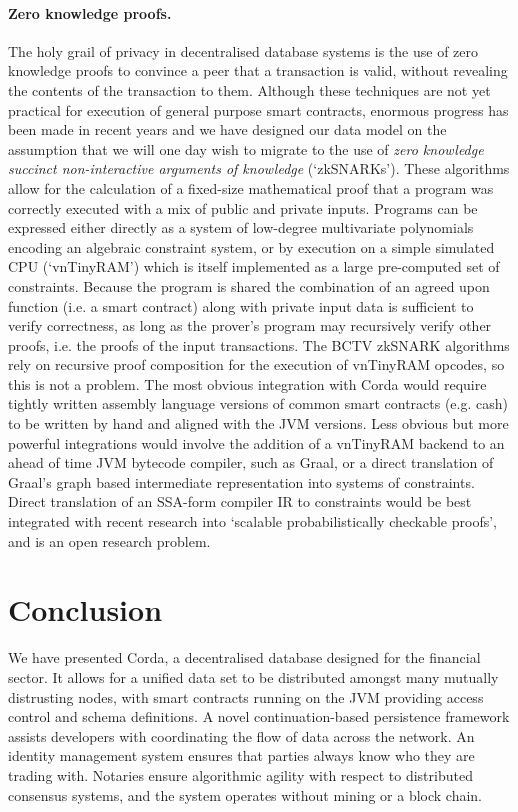 \documentclass{article}
\begin{document}
\paragraph{Zero knowledge proofs.}The holy grail of privacy in decentralised database systems is the use of zero
knowledge proofs to convince a peer that a transaction is valid, without revealing the contents of the transaction to
them. Although these techniques are not yet practical for execution of general purpose smart contracts, enormous
progress has been made in recent years and we have designed our data model on the assumption that we will one day wish
to migrate to the use of \emph{zero knowledge succinct non-interactive arguments of knowledge}\cite{184425}
(`zkSNARKs'). These algorithms allow for the calculation of a fixed-size mathematical proof that a program was correctly
executed with a mix of public and private inputs. Programs can be expressed either directly as a system of low-degree
multivariate polynomials encoding an algebraic constraint system, or by execution on a simple simulated CPU (`vnTinyRAM') which is itself
implemented as a large pre-computed set of constraints. Because the program is shared the combination of an
agreed upon function (i.e. a smart contract) along with private input data is sufficient to verify correctness,
as long as the prover's program may recursively verify other proofs, i.e. the proofs of the input transactions.
The BCTV zkSNARK algorithms rely on recursive proof composition for the execution of vnTinyRAM opcodes, so this is not a
problem. The most obvious integration with Corda would require tightly written assembly language versions of common
smart contracts (e.g. cash) to be written by hand and aligned with the JVM versions. Less obvious but more powerful
integrations would involve the addition of a vnTinyRAM backend to an ahead of time JVM bytecode compiler, such as
Graal\cite{Graal}, or a direct translation of Graal's graph based intermediate representation into systems of constraints.
Direct translation of an SSA-form compiler IR to constraints would be best integrated with recent research
into `scalable probabilistically checkable proofs'\cite{cryptoeprint:2016:646}, and is an open research problem.

\section{Conclusion}

We have presented Corda, a decentralised database designed for the financial sector. It allows for a unified data set to be
distributed amongst many mutually distrusting nodes, with smart contracts running on the JVM
providing access control and schema definitions. A novel continuation-based persistence framework assists
developers with coordinating the flow of data across the network. An identity management system ensures that
parties always know who they are trading with. Notaries ensure algorithmic agility with respect to distributed
consensus systems, and the system operates without mining or a block chain.
\end{document}
